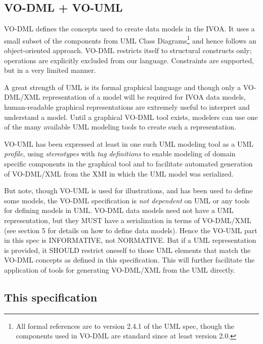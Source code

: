 \documentclass[10pt,a4paper]{ivoa}
\begin{document}
\hypertarget{vo-dml-vo-uml}{%
\subsection{VO-DML + VO-UML}\label{vo-dml-vo-uml}}

VO-DML defines the concepts used to create data models in the IVOA. It
uses a small subset of the components from UML Class Diagrams\footnote{All
  formal references are to version 2.4.1 of the UML spec, though the
  components used in VO-DML are standard since at least version 2.0.}
and hence follows an object-oriented approach. VO-DML restricts itself
to structural constructs only; operations are explicitly excluded from
our language. Constraints are supported, but in a very limited manner.

A great strength of UML is its formal graphical language and though only
a VO-DML/XML representation of a model will be required for IVOA data
models, human-readable graphical representations are extremely useful to
interpret and understand a model. Until a graphical VO-DML tool exists,
modelers can use one of the many available UML modeling tools to create
such a representation.

VO-UML has been expressed at least in one such UML modeling tool as a
UML \emph{profile}, using \emph{stereotypes} with \emph{tag definitions}
to enable modeling of domain specific components in the graphical tool
and to facilitate automated generation of VO-DML/XML from the XMI in
which the UML model was serialized.

But note, though VO-UML is used for illustrations, and has been used to
define some models, the VO-DML specification is \emph{not dependent} on
UML or any tools for defining models in UML. VO-DML data models need not
have a UML representation, but they MUST have a serialization in terms
of VO-DML/XML (see section 5 for details on how to define data models).
Hence the VO-UML part in this spec is INFORMATIVE, not NORMATIVE. But if
a UML representation is provided, it SHOULD restrict oneself to those
UML elements that match the VO-DML concepts as defined in this
specification. This will further facilitate the application of tools for
generating VO-DML/XML from the UML directly.

\hypertarget{this-specification}{%
\subsection{\texorpdfstring{This specification
}{This specification }}\label{this-specification}}
\end{document}
